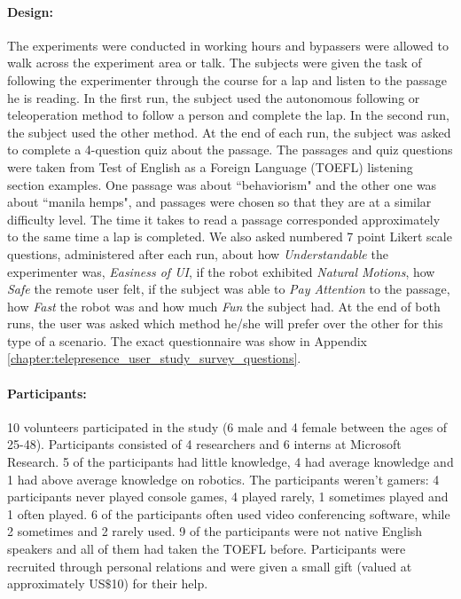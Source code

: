 \paragraph{Design:}
The experiments were conducted in working hours and bypassers were allowed to walk across the experiment area or talk. The subjects were given the task of following the experimenter through the course for a lap and listen to the passage he is reading. In the first run, the subject used the autonomous following or teleoperation method to follow a person and complete the lap. In the second run, the subject used the other method. At the end of each run, the subject was asked to complete a 4-question quiz about the passage. The passages and quiz questions were taken from Test of English as a Foreign Language (TOEFL) listening section examples. One passage was about ``behaviorism" and the other one was about ``manila hemps", and passages were chosen so that they are at a similar difficulty level. The time it takes to read a passage corresponded approximately to the same time a lap is completed. We also asked numbered 7 point Likert scale questions, administered after each run, about how \emph{Understandable} the experimenter was, \emph{Easiness of UI}, if the robot exhibited \emph {Natural Motions}, how \emph{Safe} the remote user felt, if the subject was able to \emph{Pay Attention} to the passage, how \emph{Fast} the robot was and how much \emph{Fun} the subject had. At the end of both runs, the user was asked which method he/she will prefer over the other for this type of a scenario. The exact questionnaire was show in Appendix \ref{chapter:telepresence_user_study_survey_questions}.

\paragraph{Participants:}

10 volunteers participated in the study (6 male and 4 female between the ages of 25-48). Participants consisted of 4 researchers and 6 interns at Microsoft Research. 5 of the participants had little knowledge, 4 had average knowledge and 1 had above average knowledge on robotics. The participants weren't gamers: 4 participants never played console games, 4 played rarely, 1 sometimes played and 1 often played. 6 of the participants often used video conferencing software, while 2 sometimes and 2 rarely used. 9 of the participants were not native English speakers and all of them had taken the TOEFL before. Participants were recruited through personal relations and were given a small gift (valued at approximately US$ \$ $10) for their help.

